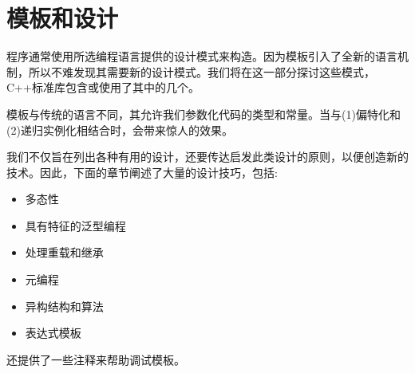 \part{模板和设计}

程序通常使用所选编程语言提供的设计模式来构造。因为模板引入了全新的语言机制，所以不难发现其需要新的设计模式。我们将在这一部分探讨这些模式，C++标准库包含或使用了其中的几个。

模板与传统的语言不同，其允许我们参数化代码的类型和常量。当与(1)偏特化和(2)递归实例化相结合时，会带来惊人的效果。

我们不仅旨在列出各种有用的设计，还要传达启发此类设计的原则，以便创造新的技术。因此，下面的章节阐述了大量的设计技巧，包括:

\begin{itemize}
  \item 多态性
  \item 具有特征的泛型编程
  \item 处理重载和继承
  \item 元编程
  \item 异构结构和算法
  \item 表达式模板
\end{itemize}

还提供了一些注释来帮助调试模板。











